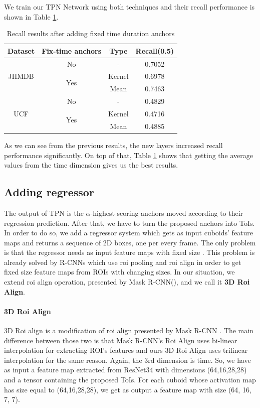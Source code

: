 We train our TPN Network using both techniques and their recall performance is shown in Table \ref{table:add_16}.

\begin{table}[h]
  \centering
  \begin{tabular}{||c | c | c || c ||}
    \hline
    \textbf{Dataset} & \textbf{Fix-time anchors} & \textbf{Type} & \textbf{Recall(0.5)} \\
    \hline  \hline
    \multirow{3}{4em}{JHMDB} & No &  - & 0.7052 \\
    \cline{2-4}
    {} & \multirow{2}{*}{Yes} & Kernel & 0.6978 \\
    \cline{3-4}
    {} & {} & Mean & 0.7463 \\
    \hline
    \multirow{3}{4em}{UCF} & No & - & 0.4829 \\
    \cline{2-4}
    {} & \multirow{2}{*}{Yes} & Kernel & 0.4716 \\
    \cline{3-4}
    {} & {} & Mean & 0.4885 \\
    \hline      
  \end{tabular}
  \caption{Recall results after adding fixed time duration anchors}
  \label{table:add_16}
\end{table}

As we can see from the previous results, the new layers increased recall performance significantly. On top of that, Table \ref{table:add_16} shows that
getting the average values from the time dimension gives us the best results.


\subsection{Adding regressor}
The output of TPN is the $\alpha$-highest scoring anchors moved according to their regression prediction. After that, we have to turn the proposed anchors into ToIs.
In order to do so, we add a regressor system which gets as input cuboids' feature maps and returns a sequence of 2D boxes, one per every frame.
The only problem is that the regressor needs as input feature maps with fixed size . This problem is already solved by R-CNNs which use roi pooling and roi align
in order to get fixed size feature maps from ROIs with changing sizes. In our situation, we extend roi align operation, presented by Mask R-CNN(\cite{DBLP:journals/corr/HeGDG17}),
and we
call it \textbf{3D Roi Align}.

\paragraph{3D Roi Align}
3D Roi align is a modification of roi align presented by Mask R-CNN . The main difference between those two is that Mask R-CNN's Roi Align uses
bi-linear interpolation for extracting ROI's features and ours 3D Roi Align uses trilinear interpolation for the same reason. Again, the 3rd dimension is
time.
So, we have as input a feature map extracted from ResNet34 with dimensions (64,16,28,28) and a tensor containing the proposed ToIs.
For each cuboid whose activation map has size equal to (64,16,28,28), we get as output a feature map with size (64, 16, 7, 7). \par

